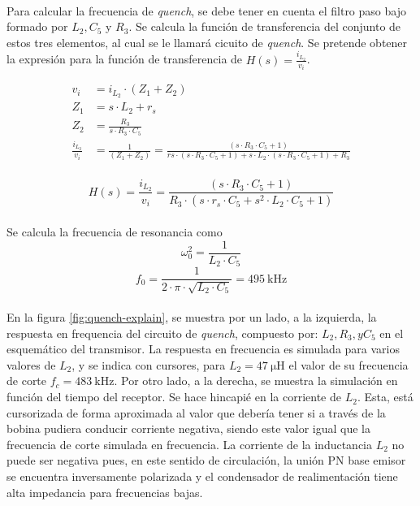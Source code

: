 \paragraph{}
Para calcular la frecuencia de \textit{quench}, se debe tener en cuenta el filtro paso bajo formado por $L_2, C_5$ y $R_3$. 
Se calcula la función de transferencia del conjunto de estos tres elementos, al cual se le llamará cicuito de \textit{quench}.
Se pretende obtener la expresión para la función de transferencia de $H(s) = \frac{i_{L_2}}{v_i}$. 

\begin{align*} 
   v_i &= i_{L_2} \cdot ( Z_1 + Z_2 ) \\
   Z_1 &= s\cdot L_2 + r_s \\
   Z_2 &= \frac{R_3}{s \cdot R_3 \cdot C_5} \\
   \frac{i_{L_2}}{v_i} &= \frac{1}{( Z_1 + Z_2 )} = \frac{(s\cdot R_3 \cdot C_5 + 1)}{rs \cdot (s\cdot R_3 \cdot C_5 + 1) + s \cdot L_2 \cdot(s\cdot R_3 \cdot C_5 + 1) + R_3 } \\
\end{align*}

\begin{equation}
   \label{eq:Al_tx}
   H(s) = \frac{i_{L_2}}{v_i} = \frac{(s\cdot R_3 \cdot C_5 + 1)}{R_3 \cdot ( s\cdot r_s \cdot C_5 + s^2 \cdot L_2 \cdot C_5 + 1)}
\end{equation}
\paragraph{}
Se calcula la frecuencia de resonancia como $$\omega_0^2 = \frac{1}{L_2 \cdot C_5}$$
$$ f_0 = \frac{1}{2 \cdot \pi \cdot \sqrt{L_2 \cdot C_5}} = \SI{495}{\kilo\hertz} $$
\paragraph{}
En la figura \ref{fig:quench-explain}, se muestra por un lado, a la izquierda, la respuesta en frequencia del circuito de \textit{quench}, compuesto por: $L_2, R_3, y C_5$ en el esquemático del transmisor. La respuesta en frecuencia es simulada para varios valores de $L_2$, y se indica con cursores, para $L_2 = \SI{47}{\micro\henry}$ el valor de su frecuencia de corte $f_c = \SI{483}{\kilo\hertz}$. 
Por otro lado, a la derecha, se muestra la simulación en función del tiempo del receptor. Se hace hincapié en la corriente de $L_2$. Esta, está cursorizada de forma aproximada al valor que debería tener si a través de la bobina pudiera conducir corriente negativa, siendo este valor igual que la frecuencia de corte simulada en frecuencia.
La corriente de la inductancia $L_2$ no puede ser negativa pues, en este sentido de circulación, la unión PN base emisor se encuentra inversamente polarizada y el condensador de realimentación tiene alta impedancia para frecuencias bajas. 

